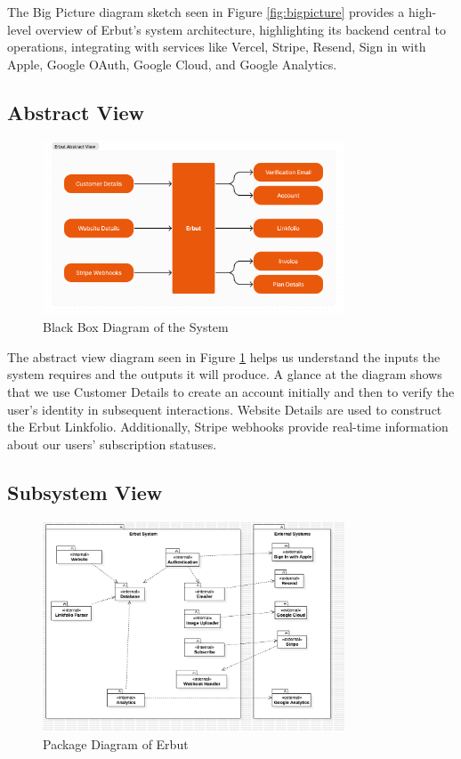 \documentclass{article}
\begin{document}
The Big Picture diagram sketch seen in Figure \ref{fig:bigpicture} provides a high-level overview of Erbut’s system architecture, highlighting its backend central to operations, integrating with services like Vercel, Stripe, Resend, Sign in with Apple, Google OAuth, Google Cloud, and Google Analytics.

\subsection{Abstract View}

\begin{figure}[h!]
\centering
\includegraphics[width=0.8\textwidth]{images/erbut-abstract-view.png}
\caption{Black Box Diagram of the System}
\label{fig:abstractview}
\end{figure}

The abstract view diagram seen in Figure \ref{fig:abstractview} helps us understand the inputs the system requires and the outputs it will produce. A glance at the diagram shows that we use Customer Details to create an account initially and then to verify the user's identity in subsequent interactions. Website Details are used to construct the Erbut Linkfolio. Additionally, Stripe webhooks provide real-time information about our users’ subscription statuses.

\subsection{Subsystem View}

\begin{figure}[h!]
\centering
\includegraphics[width=0.8\textwidth]{images/erbut-package-diagram.png}
\caption{Package Diagram of Erbut}
\label{fig:subsystemview}
\end{figure}
\end{document}
